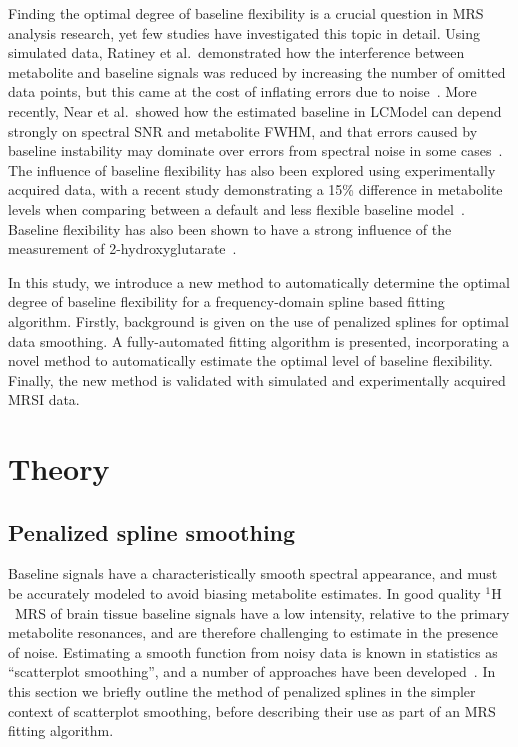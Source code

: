 \documentclass[num-refs]{wiley-article}
\newcommand{\proton}{\ensuremath{^1\mathrm{H}}}
\begin{document}
Finding the optimal degree of baseline flexibility is a crucial question in MRS analysis research, yet few studies have investigated this topic in detail. Using simulated data, Ratiney et al.\ demonstrated how the interference between metabolite and baseline signals was reduced by increasing the number of omitted data points, but this came at the cost of inflating errors due to noise~\cite{Ratiney2004}. More recently, Near et al.\ showed how the estimated baseline in LCModel can depend strongly on spectral SNR and metabolite FWHM, and that errors caused by baseline instability may dominate over errors from spectral noise in some cases~\cite{Near2013}. The influence of baseline flexibility has also been explored using experimentally acquired data, with a recent study demonstrating a 15\% difference in metabolite levels when comparing between a default and less flexible baseline model~\cite{Giapitzakis2019}. Baseline flexibility has also been shown to have a strong influence of the measurement of 2-hydroxyglutarate~\cite{Wenger2019}.

In this study, we introduce a new method to automatically determine the optimal degree of baseline flexibility for a frequency-domain spline based fitting algorithm. Firstly, background is given on the use of penalized splines for optimal data smoothing. A fully-automated fitting algorithm is presented, incorporating a novel method to automatically estimate the optimal level of baseline flexibility. Finally, the new method is validated with simulated and experimentally acquired MRSI data.

\section{Theory}
\subsection{Penalized spline smoothing}

Baseline signals have a characteristically smooth spectral appearance, and must be accurately modeled to avoid biasing metabolite estimates. In good quality \proton\ MRS of brain tissue baseline signals have a low intensity, relative to the primary metabolite resonances, and are therefore challenging to estimate in the presence of noise. Estimating a smooth function from noisy data is known in statistics as ``scatterplot smoothing'', and a number of approaches have been developed~\cite{Ruppert2003}. In this section we briefly outline the method of penalized splines in the simpler context of scatterplot smoothing, before describing their use as part of an MRS fitting algorithm.
\end{document}
